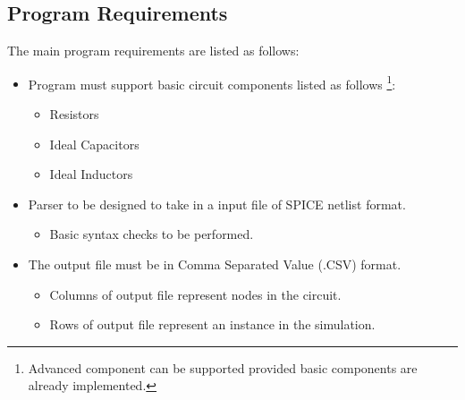 \documentclass[12pt,a4paper]{article}
\begin{document}
	\subsection{Program Requirements}
	The main program requirements are listed as follows:
	\begin{itemize}
		\item Program must support basic circuit components listed as follows \footnote{Advanced component can be supported
		provided basic components are already implemented.}:
		\begin{itemize}
			\item Resistors
			\item Ideal Capacitors
			\item Ideal Inductors
		\end{itemize}
		\item Parser to be designed to take in a input file of SPICE netlist format.
		\begin{itemize}
			\item Basic syntax checks to be performed.
		\end{itemize}
		\item The output file must be in Comma Separated Value (.CSV) format.
		\begin{itemize}
			\item Columns of output file represent nodes in the circuit.
			\item Rows of output file represent an instance in the simulation.
		\end{itemize}
	\end{itemize}
	\vfill
	\pagebreak
\end{document}
